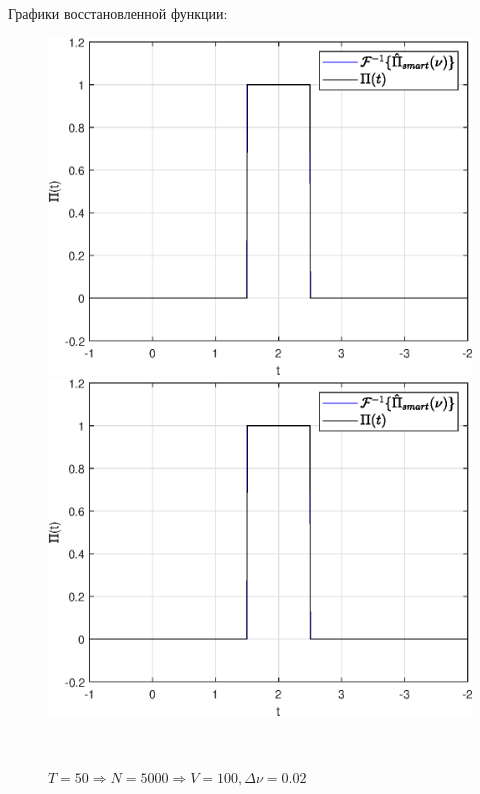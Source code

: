 \documentclass[a4paper]{article}
\begin{document}
Графики восстановленной функции:

\begin{figure}[H]
    \begin{minipage}{0.5\textwidth}
        \centering \includegraphics[width=\textwidth]{graphs/3/T_100_dt_0.010001_V_100_dv_0.01/func_inversed_smart.eps}
        \caption{$T = 1000 \Rightarrow N = 100000 \Rightarrow V = 100, \Delta \nu = 0.01$}
    \end{minipage}\hfill
    \begin{minipage}{0.5\textwidth}
        \centering \includegraphics[width=\textwidth]{graphs/3/T_50_dt_0.010002_V_100_dv_0.02/func_inversed_smart.eps}
        \caption{$T = 50 \Rightarrow N = 5000 \Rightarrow V = 100, \Delta \nu = 0.02$}
    \end{minipage}\\[1em]
\end{figure}\noindent\
\end{document}
